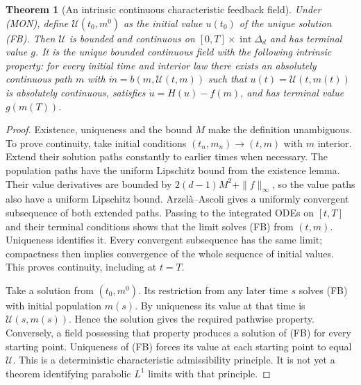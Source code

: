 \documentclass[11pt,a4paper]{article}
\newtheorem{theorem}{Theorem}[section]
\theoremstyle{definition}
\theoremstyle{remark}
\begin{document}
\begin{theorem}[An intrinsic continuous characteristic feedback field]
Under (MON), define $\mathcal U(t_0,m^0)$ as the initial value $u(t_0)$ of the unique solution (FB). Then $\mathcal U$ is bounded and continuous on $[0,T]\times\operatorname{int}\Delta_d$ and has terminal value $g$. It is the unique bounded continuous field with the following intrinsic property: for every initial time and interior law there exists an absolutely continuous path $m$ with $\dot m=b(m,\mathcal U(t,m))$ such that $u(t)=\mathcal U(t,m(t))$ is absolutely continuous, satisfies $\dot u=H(u)-f(m)$, and has terminal value $g(m(T))$.
\end{theorem}
\begin{proof}
Existence, uniqueness and the bound $M$ make the definition unambiguous. To prove continuity, take initial conditions $(t_n,m_n)\to(t,m)$ with $m$ interior. Extend their solution paths constantly to earlier times when necessary. The population paths have the uniform Lipschitz bound from the existence lemma. Their value derivatives are bounded by $2(d-1)M^2+\|f\|_\infty$, so the value paths also have a uniform Lipschitz bound. Arzel\`a--Ascoli gives a uniformly convergent subsequence of both extended paths. Passing to the integrated ODEs on $[t,T]$ and their terminal conditions shows that the limit solves (FB) from $(t,m)$. Uniqueness identifies it. Every convergent subsequence has the same limit; compactness then implies convergence of the whole sequence of initial values. This proves continuity, including at $t=T$.

Take a solution from $(t_0,m^0)$. Its restriction from any later time $s$ solves (FB) with initial population $m(s)$. By uniqueness its value at that time is $\mathcal U(s,m(s))$. Hence the solution gives the required pathwise property. Conversely, a field possessing that property produces a solution of (FB) for every starting point. Uniqueness of (FB) forces its value at each starting point to equal $\mathcal U$. This is a deterministic characteristic admissibility principle. It is not yet a theorem identifying parabolic $L^1$ limits with that principle.
\end{proof}
\end{document}
